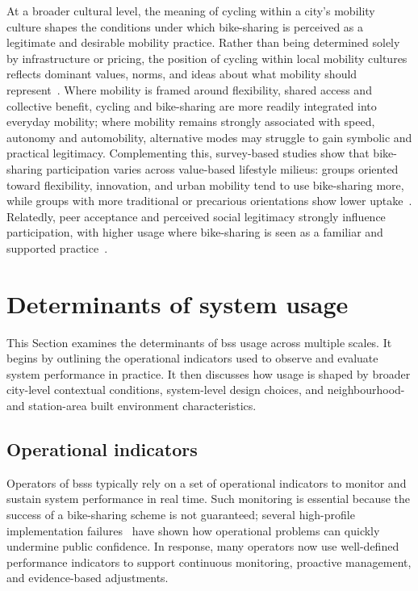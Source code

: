     At a broader cultural level, the meaning of cycling within a city’s mobility culture shapes the conditions under which bike-sharing is perceived as a legitimate and desirable mobility practice. Rather than being determined solely by infrastructure or pricing, the position of cycling within local mobility cultures reflects dominant values, norms, and ideas about what mobility should represent~\cite{Nikolaeva2019}. Where mobility is framed around flexibility, shared access and collective benefit, cycling and bike-sharing are more readily integrated into everyday mobility; where mobility remains strongly associated with speed, autonomy and automobility, alternative modes may struggle to gain symbolic and practical legitimacy. Complementing this, survey-based studies show that bike-sharing participation varies across value-based lifestyle milieus: groups oriented toward flexibility, innovation, and urban mobility tend to use bike-sharing more, while groups with more traditional or precarious orientations show lower uptake~\cite{Borgstedt2019}. Relatedly, peer acceptance and perceived social legitimacy strongly influence participation, with higher usage where bike-sharing is seen as a familiar and supported practice~\cite{Boenigk2019, Georgi2019}.


\section{Determinants of system usage}

This Section examines the determinants of \ac{bss} usage across multiple scales. It begins by outlining the operational indicators used to observe and evaluate system performance in practice. It then discusses how usage is shaped by broader city-level contextual conditions, system-level design choices, and neighbourhood- and station-area built environment characteristics.

    \subsection{Operational indicators}
    \label{sec:operational_indicators}

    Operators of \acp{bss} typically rely on a set of operational indicators to monitor and sustain system performance in real time. Such monitoring is essential because the success of a bike-sharing scheme is not guaranteed; several high-profile implementation failures~\cite{Yle2015_HelsinkiBikeShare} have shown how operational problems can quickly undermine public confidence. In response, many operators now use well-defined performance indicators to support continuous monitoring, proactive management, and evidence-based adjustments.
    
